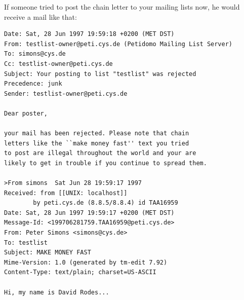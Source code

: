 \documentclass[a4paper,10pt]{scrreprt}
\begin{document}
If someone tried to post the chain letter to your mailing lists now,
he would receive a mail like that:
\begin{verbatim}
Date: Sat, 28 Jun 1997 19:59:18 +0200 (MET DST)
From: testlist-owner@peti.cys.de (Petidomo Mailing List Server)
To: simons@cys.de
Cc: testlist-owner@peti.cys.de
Subject: Your posting to list "testlist" was rejected
Precedence: junk
Sender: testlist-owner@peti.cys.de

Dear poster,

your mail has been rejected. Please note that chain
letters like the ``make money fast'' text you tried
to post are illegal throughout the world and your are
likely to get in trouble if you continue to spread them.

>From simons  Sat Jun 28 19:59:17 1997
Received: from [[UNIX: localhost]]
        by peti.cys.de (8.8.5/8.8.4) id TAA16959
Date: Sat, 28 Jun 1997 19:59:17 +0200 (MET DST)
Message-Id: <199706281759.TAA16959@peti.cys.de>
From: Peter Simons <simons@cys.de>
To: testlist
Subject: MAKE MONEY FAST
Mime-Version: 1.0 (generated by tm-edit 7.92)
Content-Type: text/plain; charset=US-ASCII

Hi, my name is David Rodes...
\end{verbatim}
\end{document}
